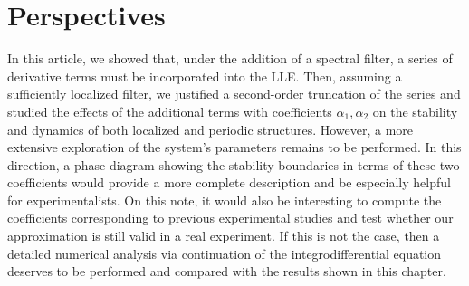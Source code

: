 

\section{Perspectives}

In this article, we showed that, under the addition of a spectral filter, a series of
derivative terms must be incorporated into the LLE. Then, assuming a sufficiently
localized filter, we justified a second-order truncation of the series and studied 
the effects of the additional terms with coefficients $\alpha_1, \alpha_2$ on the stability and dynamics of both localized 
and periodic structures. However, a more extensive exploration of the system's parameters 
remains to be performed. In this direction, a phase diagram showing the stability boundaries
in terms of these two coefficients would provide a more complete description and be
especially helpful for experimentalists. On this note, it would also be interesting to
compute the coefficients corresponding to previous experimental studies \cite{bessin2019gain}
and test whether our approximation is still valid in a real experiment. If this is not the case,
then a detailed numerical analysis via continuation of the integrodifferential 
equation deserves to be performed and compared with the results shown in this chapter.

